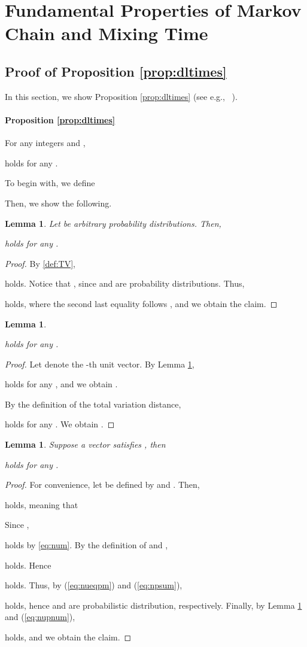 \documentclass[letter, 11pt]{article}
\newcommand{\1}{\mbox{1}\hspace{-0.25em}\mbox{l}}
\newtheorem{lemma}[theorem]{Lemma}
\begin{document}
\section{Fundamental Properties of Markov Chain and Mixing Time}\label{sec:RMC}
\subsection{Proof of Proposition \ref{prop:dltimes}}
In this section, we show Proposition \ref{prop:dltimes} (see e.g., ~\cite{LPW08, MT06}). 
\paragraph{Proposition \ref{prop:dltimes}}
  For any integers    and 
   , 

 holds for any  . 

To begin with, we define 

Then, we show the  following. 
\begin{lemma}
\label{lemm:dbarp}
Let  be arbitrary probability distributions. 
Then, 

holds for any . 
\end{lemma} 
\begin{proof}
By \eqref{def:TV}, 

holds. Notice that 
  , since  and  are probability distributions. 
Thus, 

holds, where the second last equality follows , and we obtain the claim. 
\end{proof}

\begin{lemma}
\label{lemm:ddbarineq}

holds for any . 
\end{lemma} 
\begin{proof}
Let  denote the -th unit vector. 
By Lemma \ref{lemm:dbarp}, 

holds for any , and we obtain . 

By the definition of the total variation distance, 

holds for any . We obtain . 
\end{proof}

\begin{lemma}
\label{lemm:dbarineq}
Suppose a vector  satisfies , then

holds for any . 
\end{lemma} 
\begin{proof}
For convenience, let  be defined by  and . 
Then, 

holds, meaning that 

Since , 

holds by \eqref{eq:num}. By the definition of  and , 

holds. Hence

holds. 
Thus, by (\ref{eq:nueqpm}) and (\ref{eq:npsum}), 

holds, hence  and  are probabilistic distribution, respectively. 
Finally, by Lemma \ref{lemm:dbarp} and (\ref{eq:nupnum}), 

 holds, and we obtain the claim. 
\end{proof}
\end{document}
